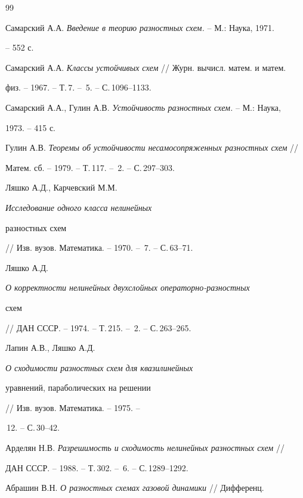 \begin{thebibliography}{99} 


 




Самарский А.А. {\em Введение в теорию разностных схем.} -- М.: Наука, 1971. 


-- 552 с. 




Самарский А.А. {\em Классы устойчивых схем} // Журн. вычисл. матем. и матем. 


физ. -- 1967. -- Т.\,7. -- \No\,5. -- С.\,1096--1133. 




Самарский А.А., Гулин А.В. {\em Устойчивость разностных схем.} -- М.: Наука, 


1973. -- 415 с. 




Гулин А.В. {\em Теоремы об устойчивости несамосопряженных разностных схем} // 


Матем. сб. -- 1979. -- Т.\,117. -- \No\,2. -- С.\,297--303. 




Ляшко А.Д., Карчевский М.М. {\em Исследование одного класса нелинейных 


разностных схем} // Изв. вузов. Математика. -- 1970. -- \No\,7. -- С.\,63--71. 




Ляшко А.Д. {\em О корректности нелинейных двухслойных операторно-разностных 


схем} // ДАН СССР. -- 1974. -- Т.\,215. -- \No\,2. -- С.\,263--265. 




Лапин А.В., Ляшко А.Д. {\em О сходимости разностных схем для квазилинейных 


уравнений, параболических на решении} // Изв. вузов. Математика. -- 1975. -- 


\No\,12. -- С.\,30--42. 




Арделян Н.В. {\em Разрешимость и сходимость нелинейных разностных схем} // 


ДАН СССР. -- 1988. -- Т.\,302. -- \No\,6. -- С.\,1289--1292. 




Абрашин В.Н. {\em О разностных схемах газовой динамики} // Дифференц. 



\end{thebibliography}
